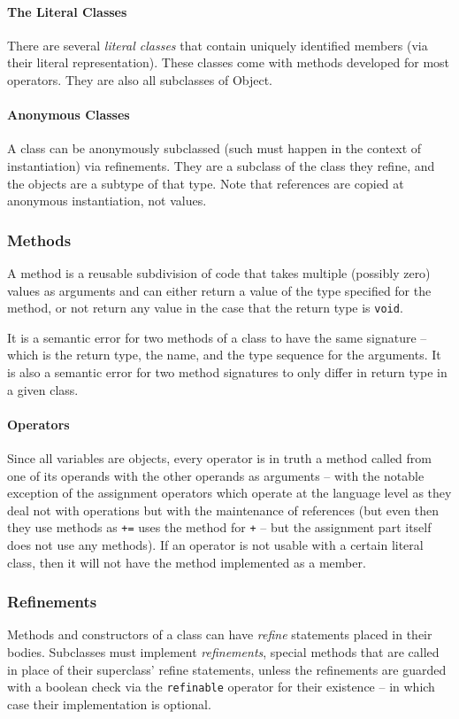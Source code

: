 \paragraph{The Literal Classes}
There are several \textit{literal classes} that contain uniquely identified members (via their literal representation). These classes come with methods developed for most operators. They are also all subclasses of Object.

\paragraph{Anonymous Classes}
A class can be anonymously subclassed (such must happen in the context of instantiation) via refinements. They are a subclass of the class they refine, and the objects are a subtype of that type. Note that references are copied at anonymous instantiation, not values.

\subsubsection{Methods}
A method is a reusable subdivision of code that takes multiple (possibly zero) values as arguments and can either return a value of the type specified for the method, or not return any value in the case that the return type is \verb!void!.

It is a semantic error for two methods of a class to have the same signature -- which is the return type, the name, and the type sequence for the arguments. It is also a semantic error for two method signatures to only differ in return type in a given class.

\paragraph{Operators}
Since all variables are objects, every operator is in truth a method called from one of its operands with the other operands as arguments -- with the notable exception of the assignment operators which operate at the language level as they deal not with operations but with the maintenance of references (but even then they use methods as \verb!+=! uses the method for \verb!+! -- but the assignment part itself does not use any methods). If an operator is not usable with a certain literal class, then it will not have the method implemented as a member.

\subsubsection{Refinements}
Methods and constructors of a class can have \textit{refine} statements placed in their bodies. Subclasses must implement \textit{refinements}, special methods that are called in place of their superclass' refine statements, unless the refinements are guarded with a boolean check via the \verb!refinable! operator for their existence -- in which case their implementation is optional.

